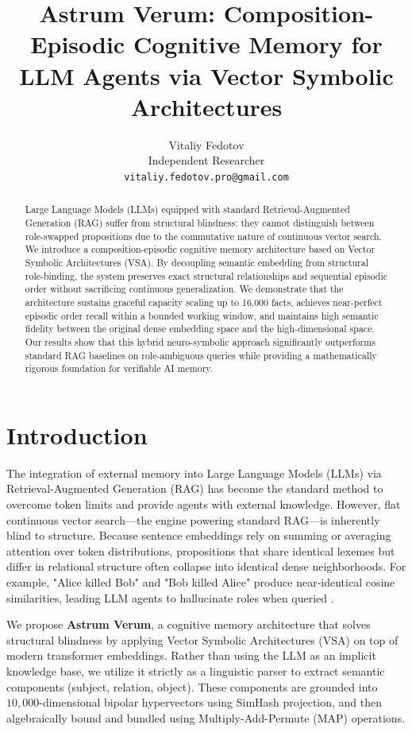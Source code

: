 \documentclass[11pt,letterpaper]{article}
\title{\LARGE \bf Astrum Verum: Composition-Episodic Cognitive Memory for LLM Agents via Vector Symbolic Architectures}
\author{
Vitaliy Fedotov \\[1ex]
Independent Researcher \\[1ex]
\texttt{vitaliy.fedotov.pro@gmail.com}
}
\date{}
\begin{document}
\maketitle

\begin{abstract}
Large Language Models (LLMs) equipped with standard Retrieval-Augmented Generation (RAG) suffer from structural blindness: they cannot distinguish between role-swapped propositions due to the commutative nature of continuous vector search. We introduce a composition-episodic cognitive memory architecture based on Vector Symbolic Architectures (VSA). By decoupling semantic embedding from structural role-binding, the system preserves exact structural relationships and sequential episodic order without sacrificing continuous generalization. We demonstrate that the architecture sustains graceful capacity scaling up to 16,000 facts, achieves near-perfect episodic order recall within a bounded working window, and maintains high semantic fidelity between the original dense embedding space and the high-dimensional space. Our results show that this hybrid neuro-symbolic approach significantly outperforms standard RAG baselines on role-ambiguous queries while providing a mathematically rigorous foundation for verifiable AI memory.
\end{abstract}

\section{Introduction}
\label{sec:intro}

The integration of external memory into Large Language Models (LLMs) via Retrieval-Augmented Generation (RAG) \cite{lewis2020rag} has become the standard method to overcome token limits and provide agents with external knowledge. However, flat continuous vector search---the engine powering standard RAG---is inherently blind to structure. Because sentence embeddings rely on summing or averaging attention over token distributions, propositions that share identical lexemes but differ in relational structure often collapse into identical dense neighborhoods. For example, "Alice killed Bob" and "Bob killed Alice" produce near-identical cosine similarities, leading LLM agents to hallucinate roles when queried \cite{kanerva2009hyperdimensional}.

We propose \textbf{Astrum Verum}, a cognitive memory architecture that solves structural blindness by applying Vector Symbolic Architectures (VSA) \cite{gayler2004vsa, kanerva2009hyperdimensional} on top of modern transformer embeddings. Rather than using the LLM as an implicit knowledge base, we utilize it strictly as a linguistic parser to extract semantic components (subject, relation, object). These components are grounded into $10{,}000$-dimensional bipolar hypervectors using SimHash projection, and then algebraically bound and bundled using Multiply-Add-Permute (MAP) operations.
\end{document}
